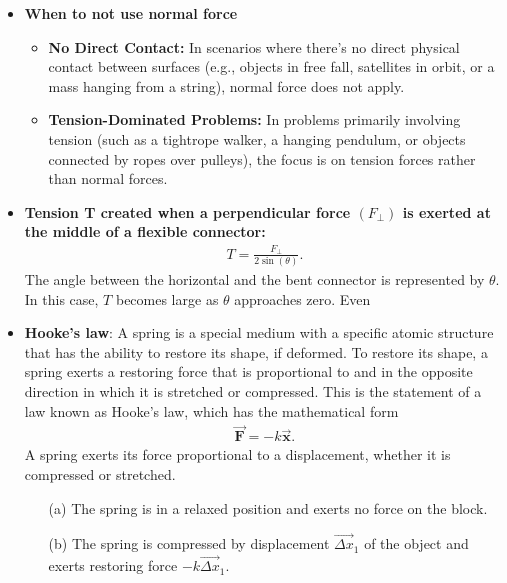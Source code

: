 \documentclass{report}
\begin{document}
\begin{itemize}
\begin{itemize}
                \end{itemize}
            \item \textbf{When to not use normal force}
                \begin{itemize}
                    \item \textbf{No Direct Contact:} In scenarios where there's no direct physical contact between surfaces (e.g., objects in free fall, satellites in orbit, or a mass hanging from a string), normal force does not apply.
                    \item \textbf{Tension-Dominated Problems:} In problems primarily involving tension (such as a tightrope walker, a hanging pendulum, or objects connected by ropes over pulleys), the focus is on tension forces rather than normal forces.
                \end{itemize}
        \item \textbf{Tension T created when a perpendicular force  $(F_{\perp})$ is exerted at the middle of a flexible connector:}
            \begin{align*}
                T=\frac{F_{\perp}}{2\sin{\left(\theta \right)}}
            .\end{align*}
            The angle between the horizontal and the bent connector is represented by $\theta$. In this case, $T$ becomes large as $\theta$ approaches zero. Even
        \item \textbf{Hooke’s law}: A spring is a special medium with a specific atomic structure that has the ability to restore its shape, if deformed. To restore its shape, a spring exerts a restoring force that is proportional to and in the opposite direction in which it is stretched or compressed. This is the statement of a law known as Hooke’s law, which has the mathematical form
            \begin{align*}
                \vec{\mathbf{F}} = -k\vec{\mathbf{x}}
            .\end{align*}
            \bigbreak \noindent 
                A spring exerts its force proportional to a displacement, whether it is compressed or stretched.
            \begin{enumerate}
                \item[(a)] The spring is in a relaxed position and exerts no force on the block.
                \item[(b)] The spring is compressed by displacement $\vec{\Delta x}_1$ of the object and exerts restoring force $-k\vec{\Delta x}_1$.

\end{enumerate}
\end{itemize}
\end{document}
